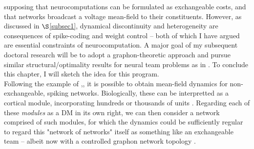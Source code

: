 \documentclass[12pt, oneside]{report}
\newcommand{\1}[1]{\mathbbm{1}_{\{#1\}}}
\theoremstyle{definition}
\begin{document}
supposing that neurocomputations can be formulated as exchangeable costs, and that networks broadcast a voltage mean-field to their constituents. However, as discussed in $\S$\ref{subsec1}, dynamical discontinuity and heterogeneity
are consequences of spike-coding and weight control -- both of which I have argued are essential constraints of neurocomputation. A major goal of my subsequent doctoral research will be to adopt a graphon-theoretic approach and pursue similar structural/optimality results for neural team problems as in \cite{Sanjari_Saldi_Yüksel_2024}. To conclude this chapter, I will sketch the idea for this program.\\[5pt]
\indent Following the example of \cite{Jabin_Zhou_2023},\cite{Jabin_Schmutz_Zhou_2024},
it is possible to obtain mean-field dynamics for non-exchangeable, spiking networks. Biologically, these can be interpretted as a cortical module, incorporating hundreds or thousands of units \cite{Mountcastle_1997}. Regarding each of these \textit{modules} as a DM in its own right,
we can then consider a network comprised of such modules, for which the dynamics could be sufficiently regular to regard this "network of networks" itself as something like an exchangeable team -- albeit now with a controlled graphon network topology \cite{Caines_Huang_2021}.
\end{document}
